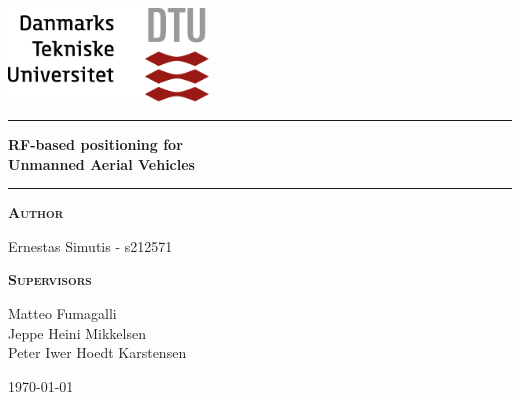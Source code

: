 
\begin{titlepage}
\begin{center}
\vspace{2cm}
\includegraphics[width=0.4\textwidth]{root/dtu.png}~\\[1cm]
\vspace{2cm}

\vspace{2cm}

\hrule
\vspace{.5cm}
{ \huge \bfseries RF-based positioning for\\ }
\vspace{.1cm}
{ \huge \bfseries Unmanned Aerial Vehicles}
\vspace{.5cm}

\hrule
\vspace{1.5cm}

\textsc{\textbf{Author}}\\
\vspace{.5cm}
\centering

Ernestas Simutis - s212571\\
\vspace{.5cm}

\textsc{\textbf{Supervisors}}\\
\vspace{.5cm}
\centering

Matteo Fumagalli\\
Jeppe Heini Mikkelsen\\
Peter Iwer Hoedt Karstensen\\

\vspace*{\fill}

\centering \today
\end{center}
\end{titlepage}

